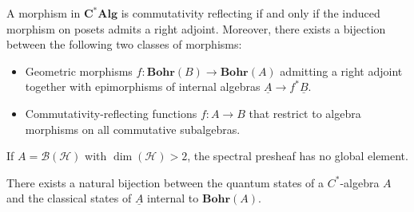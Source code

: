     \begin{property}\label{quantum:topos_morphisms}
        A morphism in $\mathbf{C^*Alg}$ is commutativity reflecting if and only if the induced morphism on posets admits a right adjoint. Moreover, there exists a bijection between the following two classes of morphisms:
        \begin{itemize}
            \item Geometric morphisms $f:\mathbf{Bohr}(B)\rightarrow\mathbf{Bohr}(A)$ admitting a right adjoint together with epimorphisms of internal algebras $\underline{A}\rightarrow f^*\underline{B}$.
            \item Commutativity-reflecting functions $f:A\rightarrow B$ that restrict to algebra morphisms on all commutative subalgebras.
        \end{itemize}
    \end{property}

    \begin{theorem}
        If $A=\mathcal{B}(\mathcal{H})$ with $\dim(\mathcal{H})>2$, the spectral presheaf has no global element.
    \end{theorem}

    \begin{property}
        There exists a natural bijection between the quantum states of a $C^*$-algebra $A$ and the classical states of $\underline{A}$ internal to $\mathbf{Bohr}(A)$.
    \end{property}

